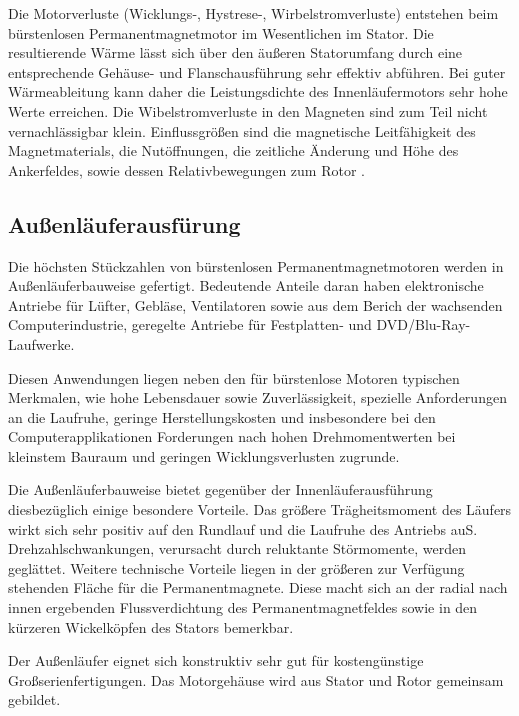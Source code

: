 Die Motorverluste (Wicklungs-, Hystrese-, Wirbelstromverluste) entstehen beim bürstenlosen Permanentmagnetmotor im Wesentlichen im Stator. Die resultierende Wärme lässt sich über den äußeren Statorumfang durch eine entsprechende Gehäuse- und Flanschausführung sehr effektiv abführen. Bei guter Wärmeableitung kann daher die Leistungsdichte des Innenläufermotors sehr hohe Werte erreichen. Die Wibelstromverluste in den Magneten sind zum Teil nicht vernachlässigbar klein. Einflussgrößen sind die magnetische Leitfähigkeit des Magnetmaterials, die Nutöffnungen, die zeitliche Änderung und Höhe des Ankerfeldes, sowie dessen Relativbewegungen zum Rotor \parencite[S. 75--76]{Stölting2011}.

\subsection{Außenläuferausfürung}

Die höchsten Stückzahlen von bürstenlosen Permanentmagnetmotoren werden in Außenläuferbauweise gefertigt. Bedeutende Anteile daran haben elektronische Antriebe für Lüfter, Gebläse, Ventilatoren sowie aus dem Berich der wachsenden Computerindustrie, geregelte Antriebe für Festplatten- und DVD/Blu-Ray-Laufwerke.

Diesen Anwendungen liegen neben den für bürstenlose Motoren typischen Merkmalen, wie hohe Lebensdauer sowie Zuverlässigkeit, spezielle Anforderungen an die Laufruhe, geringe Herstellungskosten und insbesondere bei den Computerapplikationen Forderungen nach hohen Drehmomentwerten bei kleinstem Bauraum und geringen Wicklungsverlusten zugrunde.

Die Außenläuferbauweise bietet gegenüber der Innenläuferausführung diesbezüglich einige besondere Vorteile. Das größere Trägheitsmoment des Läufers wirkt sich sehr positiv auf den Rundlauf und die Laufruhe des Antriebs auS.  Drehzahlschwankungen, verursacht durch reluktante Störmomente, werden geglättet. Weitere technische Vorteile liegen in der größeren zur Verfügung stehenden Fläche für die Permanentmagnete. Diese macht sich an der radial nach innen ergebenden Flussverdichtung des Permanentmagnetfeldes sowie in den kürzeren Wickelköpfen des Stators bemerkbar.

Der Außenläufer eignet sich konstruktiv sehr gut für kostengünstige Großserienfertigungen. Das Motorgehäuse wird aus Stator und Rotor gemeinsam gebildet.

